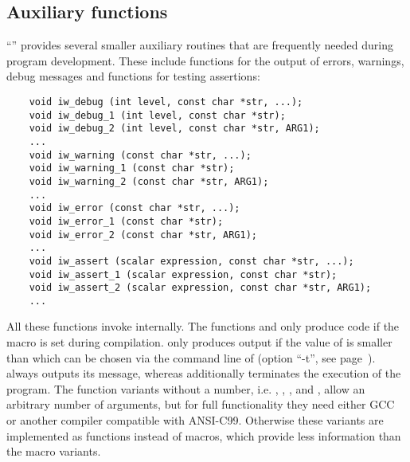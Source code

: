 \subsection{Auxiliary functions}

``'' provides several smaller auxiliary routines that
are frequently needed during program development. These include
functions for the output of errors, warnings, debug messages and
functions for testing assertions:
\begin{small}
\linespread{0.9}
\begin{verbatim}
    void iw_debug (int level, const char *str, ...);
    void iw_debug_1 (int level, const char *str);
    void iw_debug_2 (int level, const char *str, ARG1);
    ...
    void iw_warning (const char *str, ...);
    void iw_warning_1 (const char *str);
    void iw_warning_2 (const char *str, ARG1);
    ...
    void iw_error (const char *str, ...);
    void iw_error_1 (const char *str);
    void iw_error_2 (const char *str, ARG1);
    ...
    void iw_assert (scalar expression, const char *str, ...);
    void iw_assert_1 (scalar expression, const char *str);
    void iw_assert_2 (scalar expression, const char *str, ARG1);
    ...
\end{verbatim}
\end{small}
All these functions invoke  internally. The functions
 and  only
produce code if the macro  is set during
compilation.  only produces output if the
value of  is smaller than  which can be
chosen via the command line of \icewing{} (option ``-t'', see
page~). 
always outputs its message, whereas 
additionally terminates the execution of the program. The function
variants without a number, i.e. ,
, , and ,
allow an arbitrary number of arguments, but for full functionality
they need either GCC or another compiler compatible with
ANSI-C99. Otherwise these variants are implemented as functions
instead of macros, which provide less information than the macro
variants.

